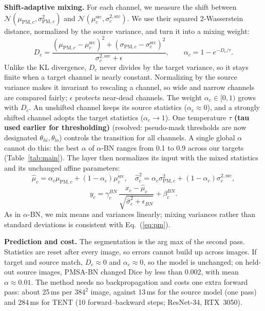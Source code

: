 \documentclass{article}
\newcommand{\src}{\mathrm{src}}
\newcommand{\PM}{\mathrm{PM}}
\begin{document}
\textbf{Shift-adaptive mixing.} For each channel, we measure the shift between
$\mathcal N(\mu_{\PM,c},\sigma^2_{\PM,c})$ and
$\mathcal N(\mu^{\src}_c,\sigma^{2,\src}_c)$. We use their squared
2-Wasserstein distance, normalized by the source variance, and turn it into a
mixing weight:
\begin{equation}
D_c=\frac{(\mu_{\PM,c}-\mu^{\src}_c)^2+(\sigma_{\PM,c}-\sigma^{\src}_c)^2}
{\sigma^{2,\src}_c+\epsilon},\qquad
\alpha_c=1-e^{-D_c/\tau}.
\label{eq:w2}
\end{equation}
Unlike the KL divergence, $D_c$ never divides by the target variance, so it stays finite when a target channel is nearly constant. Normalizing by the source variance makes it invariant to rescaling a channel, so wide and narrow channels are compared fairly; $\epsilon$ protects near-dead channels. The weight $\alpha_c\in[0,1)$ grows with $D_c$. An unshifted channel keeps its source statistics ($\alpha_c\approx0$), and a strongly shifted channel adopts the target statistics ($\alpha_c\to1$). One temperature $\tau$ \textbf{(tau used earlier for thresholding)} (resolved: pseudo-mask thresholds are now designated $\theta_{hi}, \theta_{lo}$) controls the transition for all channels. A single global $\alpha$ cannot do this: the best $\alpha$ of $\alpha$-BN ranges from 0.1 to 0.9 across our targets (Table~\ref{tab:main}). The layer then normalizes its input with the mixed statistics and its unchanged affine parameters:
\begin{equation}
\hat\mu_c=\alpha_c\mu_{\PM,c}+(1-\alpha_c)\mu^{\src}_c,\quad
\hat\sigma^2_c=\alpha_c\sigma^2_{\PM,c}+(1-\alpha_c)\sigma^{2,\src}_c,
\label{eq:mix}
\end{equation}
\begin{equation}
y_c=\gamma^{BN}_c\,\frac{x_c-\hat\mu_c}{\sqrt{\hat\sigma^2_c+\epsilon_{BN}}}+\beta^{BN}_c .
\label{eq:bn}
\end{equation}
As in $\alpha$-BN, we mix means and variances linearly; mixing variances rather than standard deviations is consistent with Eq.~(\ref{eq:pm}).

\textbf{Prediction and cost.} The segmentation is the arg max of the second pass. Statistics are reset after every image, so errors cannot build up across images. If target and source match, $D_c\approx0$ and $\alpha_c\approx0$, so the model is unchanged; on held-out source images, PMSA-BN changed Dice by less than 0.002, with mean
$\alpha\approx0.01$. The method needs no backpropagation and costs one extra forward pass: about 25\,ms per $384^2$ image, against 13\,ms for the source model (one pass) and 284\,ms for TENT (10 forward--backward steps; ResNet-34, RTX~3050).
\end{document}
